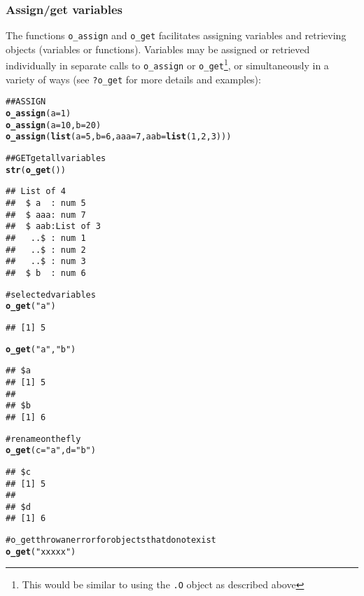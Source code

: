 \documentclass[english,10pt,a4paper]{article}\usepackage{graphicx, color}
\makeatletter
\newcommand{\hlfunctioncall}[1]{\textcolor[rgb]{0.501960784313725,0,0.329411764705882}{\textbf{#1}}}%
\newcommand{\hlstring}[1]{\textcolor[rgb]{0.6,0.6,1}{#1}}%
\newcommand{\hlcomment}[1]{\textcolor[rgb]{0.180392156862745,0.6,0.341176470588235}{#1}}%
\newenvironment{kframe}{%
 \def\at@end@of@kframe{}%
 \ifinner\ifhmode%
  \def\at@end@of@kframe{\end{minipage}}%
  \begin{minipage}{\columnwidth}%
 \fi\fi%
 \def\FrameCommand##1{\hskip\@totalleftmargin \hskip-\fboxsep
 \colorbox{shadecolor}{##1}\hskip-\fboxsep
     \hskip-\linewidth \hskip-\@totalleftmargin \hskip\columnwidth}%
 \MakeFramed {\advance\hsize-\width
   \@totalleftmargin\z@ \linewidth\hsize
   \@setminipage}}%
 {\par\unskip\endMakeFramed%
 \at@end@of@kframe}
\newenvironment{knitrout}{}{} %
\let\code=\texttt
\makeatother
\begin{document}
\subsubsection{Assign/get variables}

The functions \code{o\_assign} and \code{o\_get} facilitates assigning variables
and retrieving objects (variables or functions).
Variables may be assigned or retrieved individually in separate calls to
\code{o\_assign} or \code{o\_get}\footnote{This would be similar to using the
\code{.O} object as described above}, or simultaneously in a variety of ways
(see \code{?o\_get} for more details and examples):

\begin{knitrout}
\color{fgcolor}\begin{kframe}
\begin{alltt}
\hlcomment{## ASSIGN}
\hlfunctioncall{o_assign}(a = 1)
\hlfunctioncall{o_assign}(a = 10, b = 20)
\hlfunctioncall{o_assign}(\hlfunctioncall{list}(a = 5, b = 6, aaa = 7, aab = \hlfunctioncall{list}(1, 2, 3)))

\hlcomment{## GET get all variables}
\hlfunctioncall{str}(\hlfunctioncall{o_get}())
\end{alltt}
\begin{verbatim}
## List of 4
##  $ a  : num 5
##  $ aaa: num 7
##  $ aab:List of 3
##   ..$ : num 1
##   ..$ : num 2
##   ..$ : num 3
##  $ b  : num 6
\end{verbatim}
\begin{alltt}
\hlcomment{# selected variables}
\hlfunctioncall{o_get}(\hlstring{"a"})
\end{alltt}
\begin{verbatim}
## [1] 5
\end{verbatim}
\begin{alltt}
\hlfunctioncall{o_get}(\hlstring{"a"}, \hlstring{"b"})
\end{alltt}
\begin{verbatim}
## $a
## [1] 5
## 
## $b
## [1] 6
\end{verbatim}
\begin{alltt}
\hlcomment{# rename on the fly}
\hlfunctioncall{o_get}(c = \hlstring{"a"}, d = \hlstring{"b"})
\end{alltt}
\begin{verbatim}
## $c
## [1] 5
## 
## $d
## [1] 6
\end{verbatim}
\begin{alltt}
\hlcomment{# o_get throw an error for objects that do not exist}
\hlfunctioncall{o_get}(\hlstring{"xxxxx"})
\end{alltt}



\end{kframe}
\end{knitrout}
\end{document}
